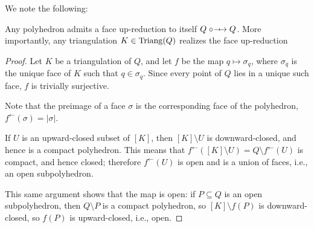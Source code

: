 We note the following:
\begin{proposition}
    Any polyhedron admits a face up-reduction to itself $Q\fupred Q$.
    More importantly, any triangulation $K\in\operatorname{Triang}(Q)$ realizes the face up-reduction
\end{proposition}
\begin{proof}
    Let $K$ be a triangulation of $Q$, and let $f$ be the map $q\mapsto \sigma_q$, where $\sigma_q$ is the unique face of $K$ such that $q\in\sigma_q$. Since every point of $Q$ lies in a unique such face, $f$ is trivially surjective.

    Note that the preimage of a face $\sigma$ is the corresponding face of the polyhedron, $f^{\gets}(\sigma)=|\sigma|$.

    If $U$ is an upward-closed subset of $[K]$, then $[K]\setminus U$ is downward-closed, and hence is a compact polyhedron. This means that $f^\gets([K]\setminus U)=Q\setminus f^{\gets}(U)$ is compact, and hence closed; therefore $f^\gets(U)$ is open and is a union of faces, i.e., an open subpolyhedron.

    This same argument shows that the map is open: if $P\subseteq Q$ is an open subpolyhedron, then $Q\setminus P$ is a compact polyhedron, so $[K]\setminus f(P)$ is downward-closed, so $f(P)$ is upward-closed, i.e., open.
\end{proof}
